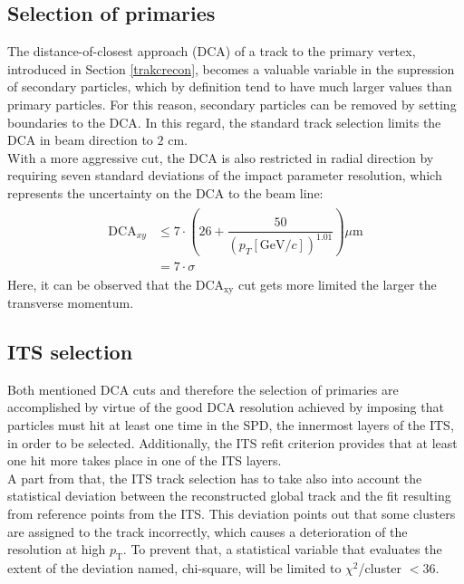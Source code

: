 \documentclass[12pt,a4paper]{report}
\begin{document}
\subsection{Selection of primaries}
\label{sec:SelOfPrim}
The distance-of-closest approach (DCA) of a track to the primary vertex, introduced in Section \ref{trakcrecon}, becomes a valuable variable in the supression of secondary particles, which by definition tend to have much larger values than primary particles. For this reason, secondary particles can be removed by setting boundaries to the DCA. In this regard, the standard track selection limits the DCA in beam direction to $2$ cm.\\
With a more aggressive cut, the DCA is also restricted in radial direction by requiring seven standard deviations of the impact parameter resolution, which represents the uncertainty on the DCA to the beam line: %
\begin{align}
\begin{split}
\text{DCA}_{xy} &\leq 7 \cdot \left(26 + \dfrac{50}{(p_{T}[\text{GeV}/c])^{1.01}}\right) \mu \text{m} \\
& = 7\cdot \sigma
\end{split}
\end{align}
Here, it can be observed that the DCA$_{\text{xy}}$ cut gets more limited the larger the transverse momentum. 
\subsection{ITS selection}
Both mentioned DCA cuts and therefore the selection of primaries are accomplished by virtue of the good DCA resolution achieved by imposing that particles must hit at least one time in the SPD, the innermost layers of the ITS, in order to be selected. Additionally, the ITS refit criterion provides that at least one hit more takes place in one of the ITS layers. \\
A part from that, the ITS track selection has to take also into account the statistical deviation between the reconstructed global track and the fit resulting from reference points from the ITS. This deviation points out that some clusters are assigned to the track incorrectly, which causes a  deterioration of the \pt resolution at high $p_\text{T}$. To prevent that, a statistical variable that evaluates the extent of the deviation named, chi-square, will be limited to $\chi^2$/cluster $< 36$.
\end{document}
